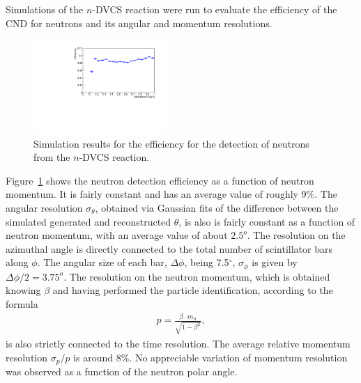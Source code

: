 Simulations of the $n$-DVCS reaction were run to evaluate the efficiency of the CND for neutrons and its angular and momentum resolutions. 
\begin{figure}[htb]  
\begin{center}
\includegraphics[width=0.45\textwidth]{Figure/canAtot.pdf}
\caption {Simulation results for the efficiency for the detection of neutrons from the $n$-DVCS reaction.}
\label{eff_vs_thr_mom}
\end{center}
\end{figure}
Figure~\ref{eff_vs_thr_mom} shows the neutron detection efficiency as a function of neutron momentum. It is fairly constant and has an average value of roughly 9\%.  
The angular resolution $\sigma_\theta$, obtained via Gaussian fits of the difference between the simulated generated and reconstructed $\theta$, is also is fairly constant as a function of neutron momentum, with an average value of about $2.5^o$. 
The resolution on the azimuthal angle is directly connected to the total number of scintillator bars along $\phi$. The angular size of each bar, $\Delta\phi$, being 7.5$^{\circ}$, %
$\sigma_\phi$ is given by $\Delta\phi/2=3.75^o$.
The resolution on the neutron momentum, which is obtained knowing $\beta$ and having performed the particle identification, according to the formula
\begin{eqnarray}
p = \frac{\beta\cdot m_n}{\sqrt{1-\beta^2}},
\end{eqnarray}
is also strictly connected to the time resolution. The average relative momentum resolution $\sigma_p/p$ is around 8\%. No appreciable variation of momentum resolution was observed as a function of the neutron polar angle. 

